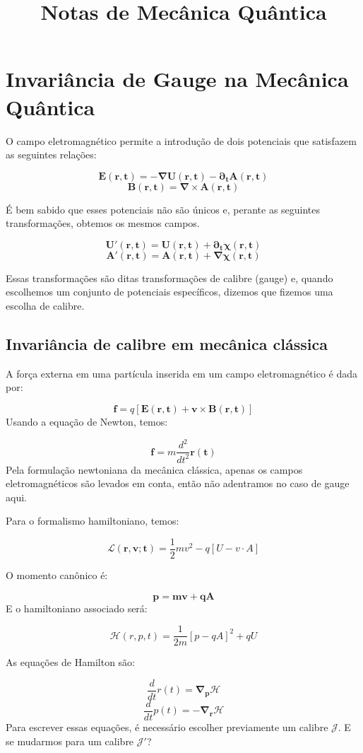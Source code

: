 \documentclass{article}
\title{Notas de Mecânica Quântica}
\author{}
\date{}
\begin{document}
	
	\maketitle
	
	\section{Invariância de Gauge na Mecânica Quântica}
	
	O campo eletromagnético permite a introdução de dois potenciais que satisfazem as seguintes relações:
	
	$$\mathbf{E(r,t)=-\nabla U(r,t)-\partial_{t}A(r,t)}$$
	$$\mathbf{B(r,t)=\nabla \times A(r,t)}$$
	
	É bem sabido que esses potenciais não são únicos e, perante as seguintes transformações, obtemos os mesmos campos.
	
	$$\mathbf{U'(r,t)=U(r,t)+\partial_{t}\chi(r,t)}$$
	$$\mathbf{A'(r,t)=A(r,t)+\nabla \chi(r,t)}$$
	
	Essas transformações são ditas transformações de calibre (gauge) e, quando escolhemos um conjunto de potenciais específicos, dizemos que fizemos uma escolha de calibre.
	
	\subsection{Invariância de calibre em mecânica clássica}
	
	A força externa em uma partícula inserida em um campo eletromagnético é dada por:
	
	$$\mathbf{f}=q\left[ \mathbf{E(r,t)+v \times B(r,t)} \right] $$
	Usando a equação de Newton, temos:
	
	$$\mathbf{f=}m \frac{d^{2}}{dt^{2}}\mathbf{r(t)}$$
	Pela formulação newtoniana da mecânica clássica, apenas os campos eletromagnéticos são levados em conta, então não adentramos no caso de gauge aqui.
	
	Para o formalismo hamiltoniano, temos:
	
	$$\mathbf{\mathcal{L}(r,v;t)=} \frac{1}{2}mv^{2}-q\left[ U-v \cdot A \right]$$
	
	O momento canônico é:
	
	$$\mathbf{p}=\mathbf{mv+qA}$$
	E o hamiltoniano associado será:
	
	$$\mathcal{H}(r,p,t)= \frac{1}{2m}\left[ p-qA \right]^{2}+qU $$
	
	As equações de Hamilton são:
	
	$$\frac{d}{dt}r(t)=\mathbf{\nabla _{p}\mathcal{H}}$$
	$$\frac{d}{dt}p(t)=-\mathbf{\nabla_{r}\mathcal{H}}$$
	Para escrever essas equações, é necessário escolher previamente um calibre $\mathcal{J}$. E se mudarmos para um calibre $\mathcal{J}'$?
	
\end{document}
